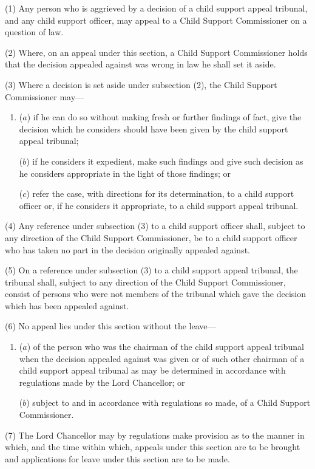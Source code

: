 \documentclass[12pt,a4paper]{article}
\begin{document}
(1) Any person who is aggrieved by a decision of a child support appeal tribunal, and any child support officer, may appeal to a Child Support Commissioner on a question of law.

(2) Where, on an appeal under this section, a Child Support Commissioner holds that the decision appealed against was wrong in law he shall set it aside.

(3) Where a decision is set aside under subsection (2), the Child Support Commissioner may—
\begin{enumerate}\item[]
($a$) if he can do so without making fresh or further findings of fact, give the decision which he considers should have been given by the child support appeal tribunal;

($b$) if he considers it expedient, make such findings and give such decision as he considers appropriate in the light of those findings; or

($c$) refer the case, with directions for its determination, to a child support officer or, if he considers it appropriate, to a child support appeal tribunal.
\end{enumerate}

(4) Any reference under subsection (3)  to a child support officer shall, subject to any direction of the Child Support Commissioner, be to a child support officer who has taken no part in the decision originally appealed against.

(5) On a reference under subsection (3)  to a child support appeal tribunal, the tribunal shall, subject to any direction of the Child Support Commissioner, consist of persons who were not members of the tribunal which gave the decision which has been appealed against.

(6) No appeal lies under this section without the leave—
\begin{enumerate}\item[]
($a$) of the person who was the chairman of the child support appeal tribunal when the decision appealed against was given or of such other chairman of a child support appeal tribunal as may be determined in accordance with regulations made by the Lord Chancellor; or

($b$) subject to and in accordance with regulations so made, of a Child Support Commissioner.
\end{enumerate}

(7) The Lord Chancellor may by regulations make provision as to the manner in which, and the time within which, appeals under this section are to be brought and applications for leave under this section are to be made.
\end{document}
